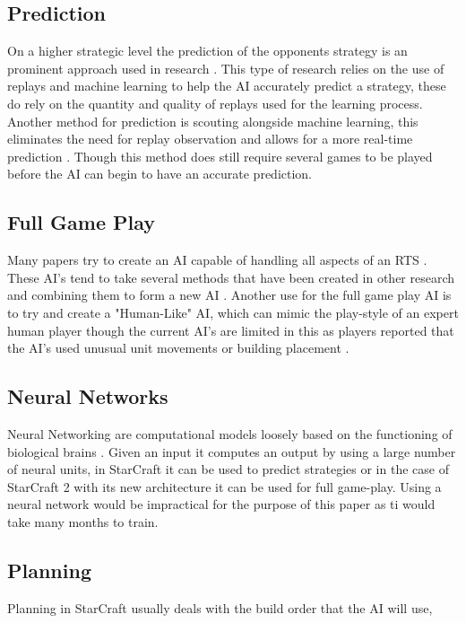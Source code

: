 \documentclass[journal]{IEEEtran}
\begin{document}
\subsection{Prediction}
On a higher strategic level the prediction of the opponents strategy is an prominent approach used in research \cite{DataMine}\cite{Bayesian}\cite{Scouting}\cite{ReplayPred}. This type of research relies on the use of replays and machine learning to help the AI accurately predict a strategy, these do rely on the quantity and quality of replays used for the learning process\cite{DataMine}\cite{Bayesian}\cite{ReplayPred}. Another method for prediction is scouting alongside machine learning, this eliminates the need for replay observation and allows for a more real-time prediction \cite{Scouting}. Though this method does still require several games to be played before the AI can begin to have an accurate prediction.

\subsection{Full Game Play}
Many papers try to create an AI capable of handling all aspects of an RTS \cite{Agents}\cite{Hierarchical}\cite{HumanLevel}\cite{SCAIL}. These AI's tend to take several methods that have been created in other research and combining them to form a new AI \cite{Agents}. Another use for the full game play AI is to try and create a "Human-Like" AI, which can mimic the play-style of an expert human player though the current AI's are limited in this as players reported that the AI's used unusual unit movements or building placement \cite{EvalHuman}.

\subsection{Neural Networks}
Neural Networking are computational models loosely based on the functioning of biological brains \cite{Deep}. Given an input it computes an output by using a large number of neural units, in StarCraft it can be used to predict strategies or in the case of StarCraft 2 with its new architecture it can be used for full game-play. Using a neural network would be impractical for the purpose of this paper as ti would take many months to train.

\subsection{Planning}
Planning in StarCraft usually deals with the build order that the AI will use, 
\cite{BuildOrder}
\cite{OnlineEvo}
\cite{GoalDriven}
\cite{Hierarchical}
\cite{Fuzzy}
\cite{Swen}
\cite{POSH}
\end{document}
